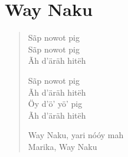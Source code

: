 \chapter{Way Naku}

\begin{verse}
Sãp nowot pig\\
Sãp nowot pig\\
Ãh d’äräh hitëh

Sãp nowot pig\\
Ãh d’äräh hitëh\\
Öy d’ö’ yö’ pig\\
Ãh d’äräh hitëh

Way Naku, yari nóóy mah\\
Marika, Way Naku
\end{verse}